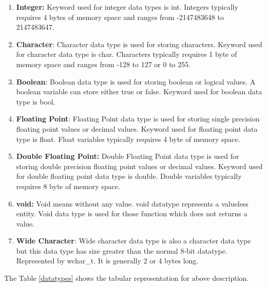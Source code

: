 \documentclass{book}
\begin{document}
\begin{enumerate}
	\item \textbf{Integer:} Keyword used for integer data types is int. Integers typically requires 4 bytes of memory space and ranges from -2147483648 to 2147483647. 
 
\item \textbf{Character}: Character data type is used for storing characters. Keyword used for character data type is char. Characters typically requires 1 byte of memory space and ranges from -128 to 127 or 0 to 255. 
 
\item \textbf{Boolean}: Boolean data type is used for storing boolean or logical values. A boolean variable can store either true or false. Keyword used for boolean data type is bool. 
 
\item \textbf{Floating Point}: Floating Point data type is used for storing single precision floating point values or decimal values. Keyword used for floating point data type is float. Float variables typically requires 4 byte of memory space. 
 
\item \textbf{Double Floating Point:} Double Floating Point data type is used for storing double precision floating point values or decimal values. Keyword used for double floating point data type is double. Double variables typically requires 8 byte of memory space. 
 
\item \textbf{void:} Void means without any value. void datatype represents a valueless entity. Void data type is used for those function which does not returns a value. 
 
\item \textbf{Wide Character}: Wide character data type is also a character data type but this data type has size greater than the normal 8-bit datatype. Represented by wchar\_t. It is generally 2 or 4 bytes long. 
\end{enumerate}

The Table \ref{datatypes} shows the tabular representation for above description. 
\end{document}
